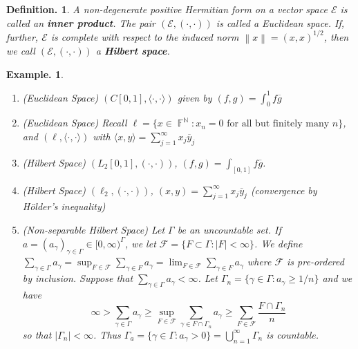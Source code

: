 \documentclass[11pt, a4paper]{memoir}
\DeclareMathOperator{\N}{{\mathbb{N}}}
\DeclareMathOperator{\F}{{\mathbb{F}}}
\newcommand{\norm}[1]{\ensuremath{\left\lVert#1\right\rVert}}
\theoremstyle{change}
\theoremstyle{plain}
\theoremstyle{nonumberplain}
\newtheorem{definition}{Definition.}
\newtheorem{example}{Example.}
\newcommand{\inr}[1]{\ensuremath{\left(#1\right)}}
\numberwithin{equation}{section}
\begin{document}
\begin{definition}
    A non-degenerate positive Hermitian form on a vector space $\mathcal{E}$ is called an \textbf{inner product}.
    The pair $(\mathcal{E},(\cdot,\cdot))$ is called a Euclidean space.
    If, further, $\mathcal{E}$ is complete with respect to the induced norm $\norm{x}=\inr{x,x}^{1/2}$, then we call $(\mathcal{E},\inr{\cdot,\cdot})$ a \textbf{Hilbert space}.
\end{definition}
\begin{example}
    \begin{enumerate}[r]
        \item (Euclidean Space) $(C[0,1],\langle\cdot,\cdot\rangle)$ given by $\inr{f,g}=\int_0^1 f\overline{g}$
        \item (Euclidean Space) Recall $\ell=\{x\in\F^{\N}:x_n=0\text{ for all but finitely many }n\}$, and $(\ell,\langle\cdot,\cdot\rangle)$ with $\langle x,y\rangle=\sum_{j=1}^\infty x_j\overline{y}_j$
        \item (Hilbert Space) $(L_2[0,1],\inr{\cdot,\cdot})$, $\inr{f,g}=\int_{[0,1]}f\overline{g}$.
        \item (Hilbert Space) $(\ell_2,\inr{\cdot,\cdot})$, $\inr{x,y}=\sum_{j=1}^\infty x_j\overline{y}_j$ (convergence by Hölder's inequality)
        \item (Non-separable Hilbert Space) Let $\Gamma$ be an uncountable set.
            If $a=(a_\gamma)_{\gamma\in\Gamma}\in[0,\infty)^\Gamma$, we let $\mathcal{F}=\{F\subset\Gamma:|F|<\infty\}$.
            We define $\sum_{\gamma\in\Gamma}a_\gamma=\sup_{F\in\mathcal{F}}\sum_{\gamma\in F}a_\gamma=\lim_{F\in\mathcal{F}}\sum_{\gamma\in F}a_\gamma$ where $\mathcal{F}$ is pre-ordered by inclusion.
            Suppose that $\sum_{\gamma\in\Gamma}a_\gamma<\infty$.
            Let $\Gamma_n=\{\gamma\in\Gamma:a_\gamma\geq 1/n\}$ and we have
            \begin{equation*}
                \infty>\sum_{\gamma\in\Gamma}a_\gamma\geq\sup_{F\in\mathcal{F}}\sum_{\gamma\in F\cap\Gamma_n}a_\gamma\geq\sum_{F\in\mathcal{F}}\frac{F\cap\Gamma_n}{n}
            \end{equation*}
            so that $|\Gamma_n|<\infty$.
            Thus $\Gamma_a=\{\gamma\in\Gamma:a_\gamma>0\}=\bigcup_{n=1}^\infty\Gamma_n$ is countable.


\end{enumerate}
\end{example}
\end{document}
